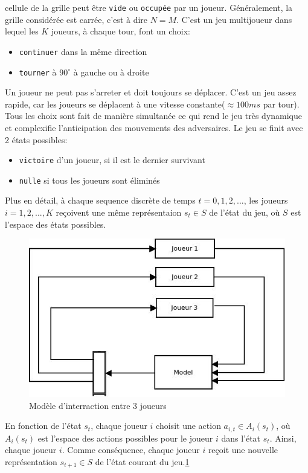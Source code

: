 cellule de la grille peut être \texttt{vide} ou \texttt{occupée} par un joueur. Généralement, la grille 
considérée est carrée, c'est à dire $N=M$. C'est un jeu multijoueur dans lequel les $K$ joueurs, à 
chaque tour, font un choix:
\begin{itemize}
	\item \texttt{continuer} dans la même direction
	\item \texttt{tourner} à $90^{\circ}$ à gauche ou à droite
\end{itemize}
Un joueur ne peut pas s'arreter et doit toujours se déplacer. C'est un jeu assez rapide, car les
joueurs se déplacent à une vitesse constante($\approx 100ms$ par tour). Tous les choix sont fait 
de manière simultanée ce qui rend le jeu très dynamique et complexifie l'anticipation des mouvements
des adversaires. Le jeu se finit avec 2 états possibles:
\begin{itemize}
	\item \texttt{victoire} d'un joueur, si il est le dernier survivant
	\item \texttt{nulle} si tous les joueurs sont éliminés
\end{itemize}

Plus en détail, à chaque sequence discrète de temps $t=0,1,2,...$, les joueurs $i=1,2,...,K$ reçoivent 
une même représentaion $s_t \in S$ de l'état du jeu, où $S$ est l'espace des états possibles. 
\begin{figure}
	\centering
	\includegraphics[scale=0.4]{Images/interraction_model.jpeg}
	\caption{Modèle d'interraction entre 3 joueurs}
	\label{fig:modele-interraction}
\end{figure}
En fonction de l'état $s_t$, chaque joueur $i$ choisit une action $a_{i,t} \in A_i(s_t)$, où $A_i(s_t)$
est l'espace des actions possibles pour le joueur $i$ dans l'état $s_t$. Ainsi, chaque joueur $i$. Comme conséquence,
chaque joueur $i$ reçoit une nouvelle représentation $s_{t+1} \in S$ de l'état courant du jeu.\ref{fig:modele-interraction}



